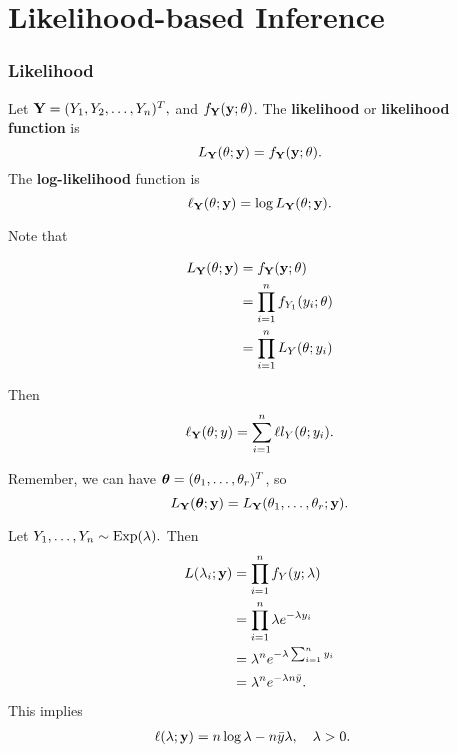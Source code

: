 \chapter{Likelihood-based Inference}
\subsection{Likelihood}

\begin{definition}
Let $\mathbf Y=(Y_1,Y_2,\ldots,Y_n)^T,$ and $f_\mathbf Y(\mathbf y;\theta)$. The \textbf{likelihood} or \textbf{likelihood function} is
$$
L_{\mathbf Y}(\theta;\mathbf y)=f_\mathbf Y(\mathbf y;\theta).
$$
The \textbf{log-likelihood} function is 
$$
\ell_\mathbf Y(\theta;\mathbf y)=\log L_\mathbf Y(\theta; \mathbf y).
$$
\end{definition}

Note that

\begin{align*}
    L_\mathbf Y(\theta;\mathbf y)&= f_\mathbf Y(\mathbf y;\theta) \\
    &= \prod^n_{i=1}f_{Y_1}(y_i;\theta)\\
    &=\prod^n_{i=1}L_Y(\theta;y_i) 
\end{align*}

Then
$$
\ell_\mathbf Y(\theta;y)=\sum^n_{i=1}\ell l_Y(\theta;y_i).
$$

Remember, we can have ${\boldsymbol{\theta}}=(\theta_1,\ldots,\theta_r)^T$, so 
$$
L_\mathbf Y({\boldsymbol{\theta}};\mathbf y)=L_\mathbf Y(\theta_1,\ldots,\theta_r;\mathbf y).
$$

\begin{eg}
Let $Y_1,\ldots,Y_n\sim \operatorname*{Exp}(\lambda).$ Then
\begin{align*}
    L(\lambda_i;\mathbf y)&=\prod^n_{i=1}f_Y(y;\lambda)\\
    &=\prod^n_{i=1}\lambda e^{-\lambda y_i} \\
    &=\lambda^ne^{-\lambda\sum^n_{i=1}y_i} \\
    &=\lambda^ne^{-\lambda n \bar y}.
\end{align*}
This implies
\begin{align*}
   \ell(\lambda;\mathbf y)&=n\log\lambda -n\bar y\lambda, \quad \lambda>0.
\end{align*}
\end{eg}

